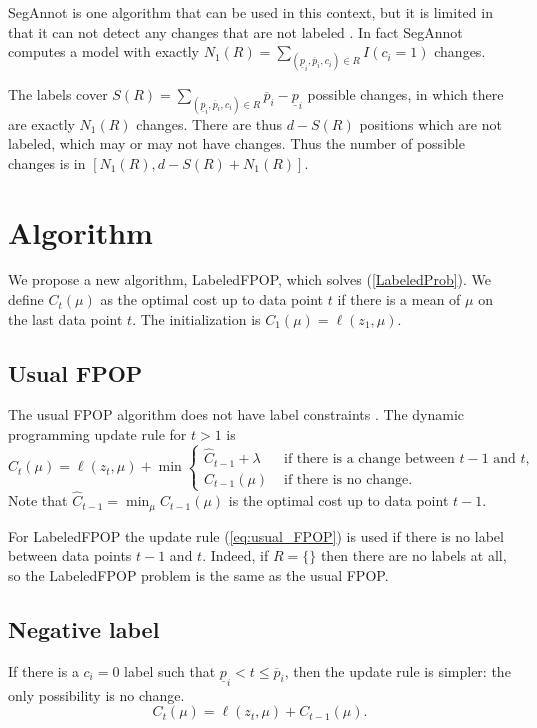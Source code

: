 \documentclass{article}
\begin{document}
SegAnnot is one algorithm that can be used in this context, but it is
limited in that it can not detect any changes that are not labeled
\citep{Hocking2012}. In fact SegAnnot computes a model with exactly
$N_1(R)=\sum_{(\underline p_i, \overline p_i, c_i)\in R} I(c_i=1)$ changes.

The labels cover
$S(R)=\sum_{(\underline p_i, \overline p_i, c_i)\in R} \overline
p_i-\underline p_i$ possible changes, in which there are exactly
$N_1(R)$ changes. There are thus $d-S(R)$ positions which are not
labeled, which may or may not have changes. Thus the number of
possible changes is in $[N_1(R), d-S(R)+N_1(R)]$.

\section{Algorithm}

We propose a new algorithm, LabeledFPOP, which solves
(\ref{LabeledProb}). We define $C_t(\mu)$ as the optimal cost up to
data point $t$ if there is a mean of $\mu$ on the last data point
$t$. The initialization is $C_1(\mu)= \ell(z_1, \mu)$. 

\subsection{Usual FPOP}
The usual FPOP algorithm does not have label constraints
\citep{Maidstone2016}. The dynamic programming update rule for $t>1$
is
\begin{equation}
  \label{eq:usual_FPOP}
  C_t(\mu)=\ell(z_t, \mu) + \min
  \begin{cases}
\hat C_{t-1}+\lambda &\text{ if there is a change between $t-1$ and $t$,}\\
C_{t-1}(\mu) & \text{ if there is no change.}
  \end{cases}
\end{equation}
Note that $\hat C_{t-1}=\min_\mu C_{t-1}(\mu)$ is the optimal cost up
to data point $t-1$.

For LabeledFPOP the update rule (\ref{eq:usual_FPOP}) is used if there
is no label between data points $t-1$ and $t$. Indeed, if $R=\{\}$
then there are no labels at all, so the LabeledFPOP problem is the
same as the usual FPOP.

\subsection{Negative label}
If there is a $c_i=0$ label such that
$\underline p_i < t \leq \overline p_i$, then the update rule is
simpler: the only possibility is no change.
\begin{equation}
  \label{eq:negative_update}
  C_t(\mu)=\ell(z_t,\mu)+
C_{t-1}(\mu).
\end{equation}
\end{document}
